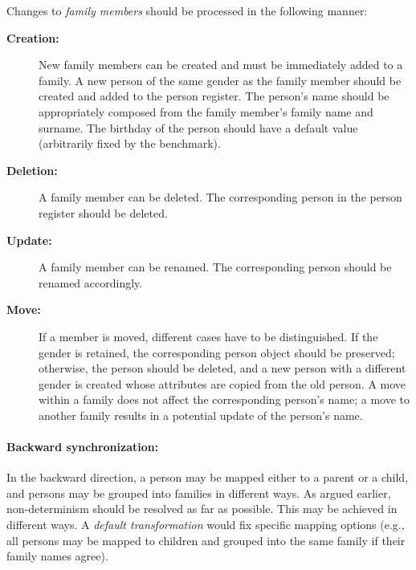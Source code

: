 \noindent Changes to \emph{family members} should be processed in the following manner: 

\begin{description}
    \item[\textbf{Creation:}]
    New family members can be created and must be immediately added to a family.
    A new person of the same gender as the family member should be created and added to the person register.
    The person's name should be appropriately composed from the family member's family name and surname.
    The birthday of the person should have a default value (arbitrarily fixed by the benchmark). 
    
    \item[\textbf{Deletion:}]
    A family member can be deleted.  The corresponding person in the person register should be deleted.
    
    \item[\textbf{Update:}]
    A family member can be renamed.  The corresponding person should be renamed accordingly.
    
    \item[\textbf{Move:}]
    If a member is moved, different cases have to be distinguished.
    If the gender is retained, the corresponding person object should be preserved; otherwise, the person should be deleted, and a new person with a different gender is created whose attributes are copied from the old person. 
    A move within a family does not affect the corresponding person's name; a move to another family results in a potential update of the person's name.
\end{description}


\paragraph{Backward synchronization:}

In the backward direction, a person may be mapped either to a parent or a child, and persons may be grouped into families in different ways. As argued earlier, non-determinism should be resolved as far as possible. This may be achieved in different ways. A \emph{default transformation} would fix specific mapping options (e.g., all persons may be mapped to children and grouped into the same family if their family names agree). 



